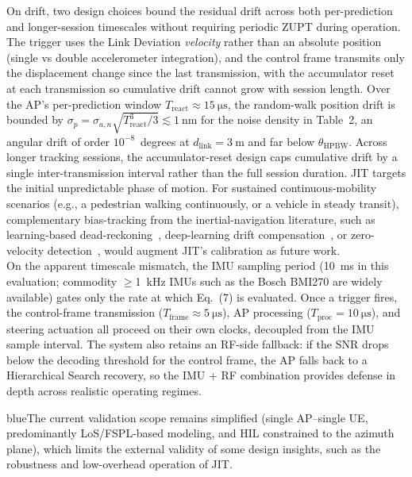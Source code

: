 \documentclass{article}
\newcommand{\blue}[1]{\begin{color}{blue}#1\end{color}}
\begin{document}
\noindent On drift, two design choices bound the residual drift across both per-prediction and longer-session timescales without requiring periodic ZUPT during operation. The trigger uses the Link Deviation \emph{velocity} rather than an absolute position (single vs double accelerometer integration), and the control frame transmits only the displacement change since the last transmission, with the accumulator reset at each transmission so cumulative drift cannot grow with session length. Over the AP's per-prediction window $T_{\text{react}} \approx \SI{15}{\micro\second}$, the random-walk position drift is bounded by $\sigma_p = \sigma_{a,n}\sqrt{T_{\text{react}}^{3}/3} \lesssim \SI{1}{\nano\meter}$ for the noise density in Table~2, an angular drift of order $10^{-8}$~degrees at $d_{\text{link}} = \SI{3}{\meter}$ and far below $\theta_{\text{HPBW}}$. Across longer tracking sessions, the accumulator-reset design caps cumulative drift by a single inter-transmission interval rather than the full session duration. JIT targets the initial unpredictable phase of motion. For sustained continuous-mobility scenarios (e.g., a pedestrian walking continuously, or a vehicle in steady transit), complementary bias-tracking from the inertial-navigation literature, such as learning-based dead-reckoning~\cite{Brossard2020AIIMU}, deep-learning drift compensation~\cite{Chen2024DLInertial}, or zero-velocity detection~\cite{Skog2010ZUPT}, would augment JIT's calibration as future work.\\

\noindent On the apparent timescale mismatch, the IMU sampling period (\SI{10}{\milli\second} in this evaluation; commodity $\geq$\SI{1}{\kilo\hertz} IMUs such as the Bosch BMI270 are widely available) gates only the rate at which Eq.~(7) is evaluated. Once a trigger fires, the control-frame transmission ($T_{\text{frame}} \approx \SI{5}{\micro\second}$), AP processing ($T_{\text{proc}} = \SI{10}{\micro\second}$), and steering actuation all proceed on their own clocks, decoupled from the IMU sample interval. The system also retains an RF-side fallback: if the SNR drops below the decoding threshold for the control frame, the AP falls back to a Hierarchical Search recovery, so the IMU + RF combination provides defense in depth across realistic operating regimes.

\begin{tcbremark}
{\selectfont
\blue{The current validation scope remains simplified (single AP--single UE, predominantly LoS/FSPL-based modeling, and HIL constrained to the azimuth plane), which limits the external validity of some design insights, such as the robustness and low-overhead operation of JIT.}
}
\end{tcbremark}
\end{document}
